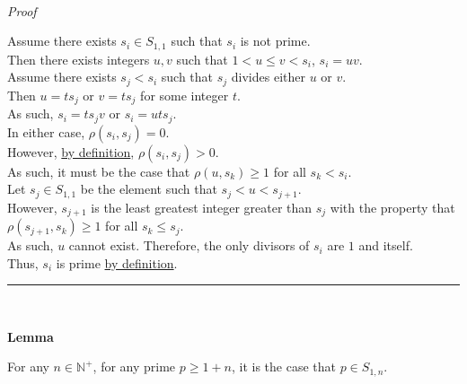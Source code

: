 \documentclass[a4paper,12pt]{article}
\begin{document}
\noindent \\
\textit{Proof}

\noindent Assume there exists $s_i \in S_{1, 1}$ such that $s_i$ is not prime.\\

\noindent Then there exists integers $u, v$ such that $1 < u \leq v < s_i$, $s_i = uv$.\\

\noindent Assume there exists $s_j < s_i$ such that $s_j$ divides either $u$ or $v$.\\

\noindent Then $u = ts_j$ or $v = ts_j$ for some integer $t$.\\

\noindent As such, $s_i = ts_jv$ or $s_i = uts_j$.\\

\noindent In either case, $\rho(s_i, s_j) = 0$.\\

\noindent However, \hyperlink{definition:awkward_number_series}{by definition}, $\rho(s_i, s_j) > 0$.\\

\noindent As such, it must be the case that $\rho(u, s_k) \geq 1$ for all $s_k < s_i$.\\

\noindent Let $s_j \in S_{1, 1}$ be the element such that $s_j < u < s_{j + 1}$.\\

\noindent However, $s_{j + 1}$ is the least greatest integer greater than $s_j$ with the property that $\rho(s_{j + 1}, s_k) \geq 1$ for all $s_k \leq s_j$.\\

\noindent As such, $u$ cannot exist. Therefore, the only divisors of $s_i$ are $1$ and itself.\\

\noindent Thus, $s_i$ is prime \hyperlink{definition:prime_numbers}{by definition}.

\begin{center}
\noindent\rule{8cm}{0.4pt}
\end{center}
\noindent \\






\label{lemma:primes_in_asn}
\hypertarget{lemma:primes_in_asn}{}
\begin{tcolorbox}
\textbf{Lemma}

For any $n \in \mathbb{N}^+$, for any prime $p \geq 1 + n$, it is the case that $p \in S_{1, n}$.
\end{tcolorbox}
\end{document}
